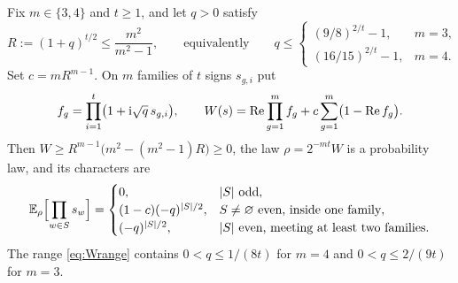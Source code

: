 \begin{lemma}\label{lem:corrected}
Fix $m\in\{3,4\}$ and $t\ge1$, and let $q>0$ satisfy
\begin{equation}\label{eq:Wrange}
R:=(1+q)^{t/2}\le\frac{m^2}{m^2-1},\qquad\text{equivalently}\qquad
q\le\begin{cases}
(9/8)^{2/t}-1,&m=3,\\
(16/15)^{2/t}-1,&m=4.
\end{cases}
\end{equation}
Set $c=mR^{m-1}$. On $m$ families of $t$ signs $s_{g,i}$ put
\begin{equation}\label{eq:Wdensity}
f_g=\prod_{i=1}^t\bigl(1+\mathrm{i}\sqrt q\,s_{g,i}\bigr),\qquad
W(s)=\operatorname{Re}\prod_{g=1}^mf_g+c\sum_{g=1}^m\bigl(1-\operatorname{Re} f_g\bigr).
\end{equation}
Then $W\ge R^{m-1}\bigl(m^2-(m^2-1)R\bigr)\ge0$, the law $\rho=2^{-mt}W$ is a probability law, and its characters are
\begin{equation}\label{eq:Wmoments}
\mathbb E_\rho\Bigl[\prod_{w\in S}s_w\Bigr]=
\begin{cases}
0,&|S|\text{ odd},\\
(1-c)(-q)^{|S|/2},&S\ne\varnothing\text{ even, inside one family},\\
(-q)^{|S|/2},&|S|\text{ even, meeting at least two families}.
\end{cases}
\end{equation}
The range \eqref{eq:Wrange} contains $0<q\le1/(8t)$ for $m=4$ and $0<q\le2/(9t)$ for $m=3$.
\end{lemma}


